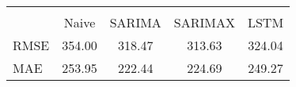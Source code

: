 \begin{tabular}{lcccc}
\hline\hline\\[-1.8ex]
 & Naive & SARIMA & SARIMAX & LSTM \\
\hline
RMSE & 354.00 & 318.47 & 313.63 & 324.04 \\
MAE & 253.95 & 222.44 & 224.69 & 249.27 \\
\hline\hline
\end{tabular}